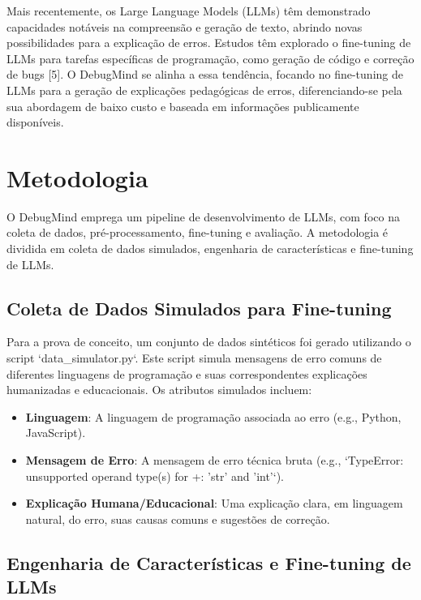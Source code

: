 \documentclass{article}
\begin{document}
Mais recentemente, os Large Language Models (LLMs) têm demonstrado capacidades notáveis na compreensão e geração de texto, abrindo novas possibilidades para a explicação de erros. Estudos têm explorado o fine-tuning de LLMs para tarefas específicas de programação, como geração de código e correção de bugs [5]. O DebugMind se alinha a essa tendência, focando no fine-tuning de LLMs para a geração de explicações pedagógicas de erros, diferenciando-se pela sua abordagem de baixo custo e baseada em informações publicamente disponíveis.

\section{Metodologia}

O DebugMind emprega um pipeline de desenvolvimento de LLMs, com foco na coleta de dados, pré-processamento, fine-tuning e avaliação. A metodologia é dividida em coleta de dados simulados, engenharia de características e fine-tuning de LLMs.

\subsection{Coleta de Dados Simulados para Fine-tuning}

Para a prova de conceito, um conjunto de dados sintéticos foi gerado utilizando o script `data_simulator.py`. Este script simula mensagens de erro comuns de diferentes linguagens de programação e suas correspondentes explicações humanizadas e educacionais. Os atributos simulados incluem:
\begin{itemize}
    \item \textbf{Linguagem}: A linguagem de programação associada ao erro (e.g., Python, JavaScript).
    \item \textbf{Mensagem de Erro}: A mensagem de erro técnica bruta (e.g., `TypeError: unsupported operand type(s) for +: 'str' and 'int'`).
    \item \textbf{Explicação Humana/Educacional}: Uma explicação clara, em linguagem natural, do erro, suas causas comuns e sugestões de correção.
\end{itemize}

\subsection{Engenharia de Características e Fine-tuning de LLMs}
\end{document}

